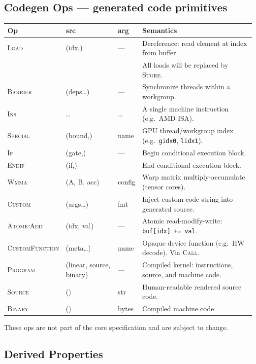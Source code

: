 \documentclass[10pt,letterpaper]{article}
\newcommand{\op}[1]{\textsc{#1}}
\begin{document}
\subsection*{Codegen Ops \normalfont\small--- generated code primitives}

\begin{tabular}{@{}l l l l@{}}
\toprule
\textbf{Op} & \textbf{src} & \textbf{arg} & \textbf{Semantics} \\
\midrule
\op{Load} & (idx,) & --- & Dereference: read element at index from buffer. \\
 & & & All loads will be replaced by \op{Store}. \\
\op{Barrier} & (deps\ldots) & --- & Synchronize threads within a workgroup. \\
\op{Ins} & \ldots & \ldots & A single machine instruction (e.g.\ AMD ISA). \\
\op{Special} & (bound,) & name & GPU thread/workgroup index (e.g.\ \texttt{gidx0}, \texttt{lidx1}). \\
\op{If} & (gate,) & --- & Begin conditional execution block. \\
\op{Endif} & (if,) & --- & End conditional execution block. \\
\op{Wmma} & (A, B, acc) & config & Warp matrix multiply-accumulate (tensor cores). \\
\op{Custom} & (args\ldots) & fmt & Inject custom code string into generated source. \\
\op{AtomicAdd} & (idx, val) & --- & Atomic read-modify-write: \texttt{buf[idx] += val}. \\[4pt]
\op{CustomFunction} & (meta\ldots) & name & Opaque device function (e.g.\ HW decode). Via \op{Call}. \\
\op{Program} & (linear, source, binary) & --- & Compiled kernel: instructions, source, and machine code. \\
\op{Source} & () & str & Human-readable rendered source code. \\
\op{Binary} & () & bytes & Compiled machine code. \\
\bottomrule
\end{tabular}

\smallskip
These ops are not part of the core specification and are subject to change.

\subsection*{Derived Properties}
\end{document}
